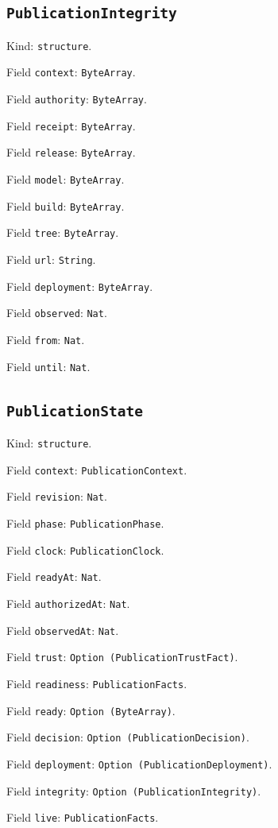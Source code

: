 \documentclass[11pt]{article}
\begin{document}
\subsection*{\texttt{PublicationIntegrity}}
\noindent Kind: \texttt{structure}.\par
\noindent Field \texttt{context}: \texttt{ByteArray}.\par
\noindent Field \texttt{authority}: \texttt{ByteArray}.\par
\noindent Field \texttt{receipt}: \texttt{ByteArray}.\par
\noindent Field \texttt{release}: \texttt{ByteArray}.\par
\noindent Field \texttt{model}: \texttt{ByteArray}.\par
\noindent Field \texttt{build}: \texttt{ByteArray}.\par
\noindent Field \texttt{tree}: \texttt{ByteArray}.\par
\noindent Field \texttt{url}: \texttt{String}.\par
\noindent Field \texttt{deployment}: \texttt{ByteArray}.\par
\noindent Field \texttt{observed}: \texttt{Nat}.\par
\noindent Field \texttt{from}: \texttt{Nat}.\par
\noindent Field \texttt{until}: \texttt{Nat}.\par
\subsection*{\texttt{PublicationState}}
\noindent Kind: \texttt{structure}.\par
\noindent Field \texttt{context}: \texttt{PublicationContext}.\par
\noindent Field \texttt{revision}: \texttt{Nat}.\par
\noindent Field \texttt{phase}: \texttt{PublicationPhase}.\par
\noindent Field \texttt{clock}: \texttt{PublicationClock}.\par
\noindent Field \texttt{readyAt}: \texttt{Nat}.\par
\noindent Field \texttt{authorizedAt}: \texttt{Nat}.\par
\noindent Field \texttt{observedAt}: \texttt{Nat}.\par
\noindent Field \texttt{trust}: \texttt{Option (PublicationTrustFact)}.\par
\noindent Field \texttt{readiness}: \texttt{PublicationFacts}.\par
\noindent Field \texttt{ready}: \texttt{Option (ByteArray)}.\par
\noindent Field \texttt{decision}: \texttt{Option (PublicationDecision)}.\par
\noindent Field \texttt{deployment}: \texttt{Option (PublicationDeployment)}.\par
\noindent Field \texttt{integrity}: \texttt{Option (PublicationIntegrity)}.\par
\noindent Field \texttt{live}: \texttt{PublicationFacts}.\par
\end{document}
